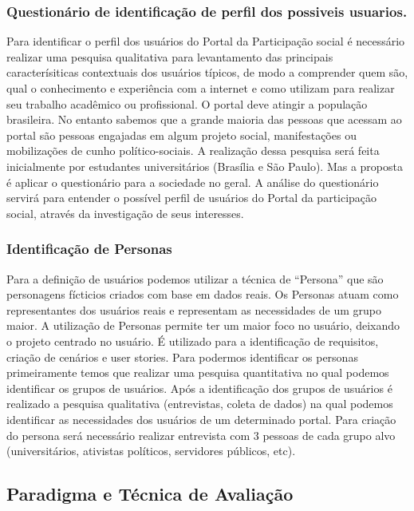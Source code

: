 \subsubsection{Questionário de identificação de perfil dos possiveis usuarios.}

Para identificar o perfil dos usuários do Portal da Participação social é necessário realizar uma pesquisa qualitativa para levantamento das principais caracterísiticas contextuais dos usuários típicos, de modo a comprender quem são, qual o conhecimento e experiência com a internet e como utilizam para realizar seu trabalho acadêmico ou profissional. 
O portal deve atingir a população brasileira. No entanto sabemos que a grande maioria das pessoas que acessam ao portal são pessoas engajadas em algum projeto social, manifestações ou mobilizações de cunho político-sociais. A realização dessa pesquisa será feita inicialmente por estudantes universitários (Brasília e São Paulo). Mas a proposta é aplicar o questionário para a sociedade no geral.
A análise do questionário servirá para entender o possível perfil de usuários do Portal da participação social, através da investigação de seus interesses.


\subsubsection{Identificação de Personas}

Para a definição de usuários podemos utilizar a técnica de “Persona” que são personagens fícticios criados com base em dados reais. Os Personas atuam como representantes dos usuários reais e representam as necessidades de um grupo maior. 
A utilização de Personas permite ter um maior foco no usuário, deixando o projeto centrado no usuário. É utilizado para a identificação de requisitos, criação de cenários e user stories. 
	Para podermos identificar os personas primeiramente temos que realizar uma pesquisa quantitativa no qual podemos identificar os grupos de usuários. Após a identificação dos grupos de usuários é realizado a pesquisa qualitativa (entrevistas, coleta de dados) na qual podemos identificar as necessidades dos usuários de um determinado portal.
Para criação do persona será necessário realizar entrevista com 3 pessoas de cada grupo alvo (universitários, ativistas políticos, servidores públicos, etc).

\subsection{Paradigma e Técnica de Avaliação}

